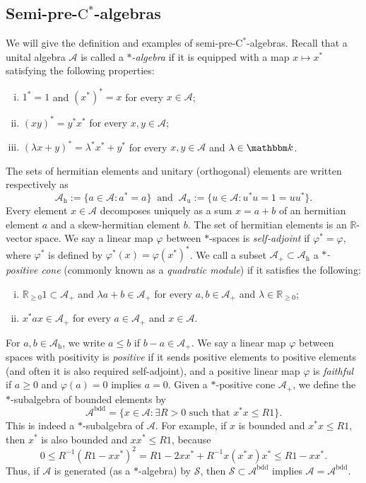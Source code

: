 \documentclass[12pt]{amsart}
\theoremstyle{definition}
\begin{document}
\subsection{Semi-pre-$\mathrm{C}^*$-algebras}
We will give the definition and examples of {semi-pre-$\mathrm{C}^*$-alge\-bra\xspace}{}s.
Recall that a unital algebra ${{\mathcal A}}$ is called a \emph{$*$-algebra}
if it is equipped with a map $x\mapsto x^*$ satisfying the following properties:
\begin{enumerate}[(i)]
\item
$1^*=1$ and $(x^*)^*=x$ for every $x \in {{\mathcal A}}$;
\item
$(xy)^*=y^*x^*$ for every $x,y \in {{\mathcal A}}$;
\item
$(\lambda x + y)^*=\lambda^*x^*+y^*$ for every $x,y \in {{\mathcal A}}$ and $\lambda\in{{\mathbbm k}}$.
\end{enumerate}
The sets of hermitian elements and unitary (orthogonal) elements are written respectively as
\[
{{\mathcal A}}_{\mathrm{h}} := \{ a\in {{\mathcal A}} : a^*=a \}
\ \mbox{ and }\
{{\mathcal A}}_{\mathrm{u}} := \{ u\in {{\mathcal A}} : u^*u=1=uu^*\}.
\]
Every element $x\in{{\mathcal A}}$ decomposes uniquely as a sum $x=a+b$ of
an hermitian element $a$ and a skew-hermitian element $b$.
The set of hermitian elements is an ${{\mathbb R}}$-vector space.
We say a linear map ${\varphi}$ between $*$-spaces is
\emph{self-adjoint} if ${\varphi}^*={\varphi}$, where ${\varphi}^*$ is
defined by ${\varphi}^*(x)={\varphi}(x^*)^*$.
We call a subset ${{\mathcal A}}_+\subset{{\mathcal A}}_{\mathrm{h}}$ a \emph{$*$-positive cone}
(commonly known as a \emph{quadratic module}) if it satisfies the following:
\begin{enumerate}[(i)]
\item
${{\mathbb R}}_{\geq0}1\subset{{\mathcal A}}_+$ and
$\lambda a + b \in {{\mathcal A}}_+$ for every $a,b \in {{\mathcal A}}_+$ and $\lambda\in{{\mathbb R}}_{\geq0}$;
\item
$x^*ax\in{{\mathcal A}}_+$ for every $a \in {{\mathcal A}}_+$ and $x \in {{\mathcal A}}$.
\end{enumerate}
For $a,b\in{{\mathcal A}}_{\mathrm{h}}$, we write $a\le b$ if $b-a\in{{\mathcal A}}_+$.
We say a linear map ${\varphi}$ between spaces with positivity
is \emph{positive} if it sends positive elements to positive elements
(and often it is also required self-adjoint),
and a positive linear map ${\varphi}$ is \emph{faithful} if $a\geq0$ and ${\varphi}(a)=0$ implies $a=0$.
Given a $*$-positive cone ${{\mathcal A}}_+$, we define the $*$-subalgebra of bounded elements by
\[
{{\mathcal A}}^{\mathrm{bdd}}=\{ x\in {{\mathcal A}} : \exists R>0\mbox{ such that }x^*x\le R1\}.
\]
This is indeed a $*$-subalgebra of ${{\mathcal A}}$. 
For example, if $x$ is bounded and $x^*x\le R1$, then $x^*$ is also
bounded and $xx^*\le R1$, because
\[
0 \le R^{-1}(R1-xx^*)^2 = R1-2xx^*+R^{-1}x(x^*x)x^*\le R 1- xx^*.
\]
Thus, if ${{\mathcal A}}$ is generated (as a $*$-algebra) by ${{\mathcal S}}$,
then ${{\mathcal S}}\subset{{\mathcal A}}^{\mathrm{bdd}}$ implies ${{\mathcal A}}={{\mathcal A}}^{\mathrm{bdd}}$.
\end{document}
